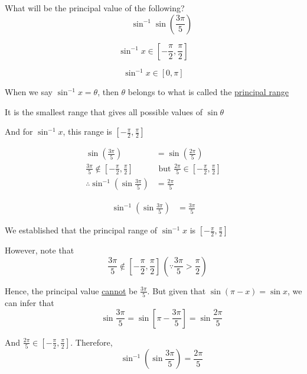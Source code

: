 \documentclass[14pt,fleqn]{extarticle}
\begin{document}
\newcommand\prange{\left[-\frac{\pi}{2}, \frac{\pi}{2} \right]}
What will be the principal value of the following? 
\[\qquad  \sin^{-1}\sin\left(\frac{3\pi}{5}\right) \]
%

\newcard

\[ \sin^{-1} x \in \prange \]

\newcard 
\[ \sin^{-1} x \in \left[0,\pi\right] \]

\newcard 

When we say $\sin^{-1} x = \theta$, then $\theta$ belongs to what is called 
the \underline{principal range} \newline 

It is the smallest range that gives all possible values of $\sin\theta$\newline 

And for $\sin^{-1} x$, this range is $\prange$ 

\newcard 

\begin{align}
	\sin \left(\frac{3\pi}{5} \right) &= \sin \left(\frac{2\pi}{5} \right) \\
	\frac{3\pi}{5} \notin \prange &\text{ but } \frac{2\pi}{5}\in \prange \\
	\therefore \sin^{-1} \left(\sin \frac{3\pi}{5} \right) &= \frac{2\pi}{5}
\end{align}

\newcard 

\begin{align}
	\sin^{-1} \left(\sin \frac{3\pi}{5} \right) &= \frac{3\pi}{5} 
\end{align}
\newcard 

We established that the principal range of $\sin^{-1} x$ is $\prange$\newline 

However, note that 
\[ \quad \frac{3\pi}{5}\notin \prange\, \left(\because \frac{3\pi}{5} > \frac{\pi}{2} \right) \] 

Hence, the principal value \underline{cannot} be $\frac{3\pi}{5}$. But given that $\sin \left(\pi - x \right) = \sin x$, we can infer that 
\[ \qquad \sin \frac{3\pi}{5} = \sin \left[\pi - \frac{3\pi}{5} \right] = \sin \frac{2\pi}{5} \]

And $\frac{2\pi}{5}\in\prange$. Therefore, 
\[ \qquad \sin^{-1} \left(\sin \frac{3\pi}{5} \right) = \frac{2\pi}{5}\]
\end{document}
